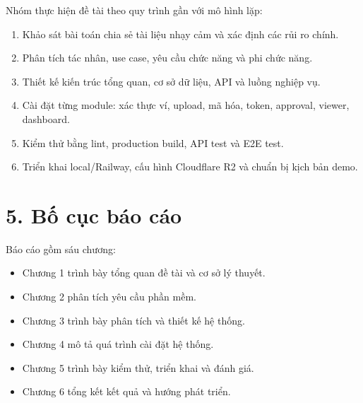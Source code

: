 Nhóm thực hiện đề tài theo quy trình gần với mô hình lặp:

\begin{enumerate}
  \item Khảo sát bài toán chia sẻ tài liệu nhạy cảm và xác định các rủi ro chính.
  \item Phân tích tác nhân, use case, yêu cầu chức năng và phi chức năng.
  \item Thiết kế kiến trúc tổng quan, cơ sở dữ liệu, API và luồng nghiệp vụ.
  \item Cài đặt từng module: xác thực ví, upload, mã hóa, token, approval, viewer, dashboard.
  \item Kiểm thử bằng lint, production build, API test và E2E test.
  \item Triển khai local/Railway, cấu hình Cloudflare R2 và chuẩn bị kịch bản demo.
\end{enumerate}

\section*{5. Bố cục báo cáo}
{}

Báo cáo gồm sáu chương:

\begin{itemize}
  \item Chương 1 trình bày tổng quan đề tài và cơ sở lý thuyết.
  \item Chương 2 phân tích yêu cầu phần mềm.
  \item Chương 3 trình bày phân tích và thiết kế hệ thống.
  \item Chương 4 mô tả quá trình cài đặt hệ thống.
  \item Chương 5 trình bày kiểm thử, triển khai và đánh giá.
  \item Chương 6 tổng kết kết quả và hướng phát triển.
\end{itemize}

\clearpage
